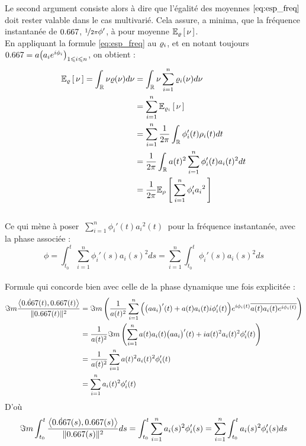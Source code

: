 Le second argument consiste alors à dire que l'égalité des moyennes $\eqref{eq:esp_freq}$ doit rester valable dans le cas multivarié. Cela assure, a minima, que la fréquence instantanée de $\x$, $\nicefrac{1}{2\pi}\phi'$, à pour moyenne $\esp[\densis]{\nu}$.
\\

En appliquant la formule \eqref{eq:esp_freq} au $\densis_i$, et en notant toujours $\x = a\big(a_ie^{i\phi_i}\big)_{1\leq i\leq n}$, on obtient :
\begin{align*}
	\esp[\densis]{\nu} = \int_\R \nu\densis(\nu)d\nu &= \int_\R \nu\sum_{i=1}^n \densis_i(\nu) d\nu \\
	&= \sum_{i=1}^n\esp[\densis_i]{\nu} \\
	&= \sum_{i=1}^n\frac{1}{2\pi}\int_\R \phi_i'(t)\densit_i(t)dt \\
	&= \frac{1}{2\pi}\int_\R a(t)^2\sum_{i=1}^n\phi_i'(t)a_i(t)^2 dt 
	\\ &= \frac{1}{2\pi} \esp[\densit]{\sum_{i=1}^n \phi_i'{a_i}^2}
\end{align*}
\\
Ce qui mène à poser $\displaystyle \ \sum_{i=1}^n \phi_i'(t){a_i}^2(t)\ $ pour la fréquence instantanée, avec la phase associée :
\begin{equation}\label{eq:phas_inst_v2}
	\phi = \int_{t_0}^t \sum_{i=1}^n \phi_i'(s){a_i}(s)^2ds 
	= \sum_{i=1}^n \int_{t_0}^t \phi_i'(s){a_i}(s)^2ds 
\end{equation}
\\

Formule qui concorde bien avec celle de la phase dynamique une fois explicitée :
\begin{align*}
	\Im m\frac{\big\langle \dot{\x}(t) , \x(t) \big\rangle}{\|\x(t)\|^2} &= \Im m\left( \frac{1}{a(t)^2} \sum_{i=1}^n \Big( \big(aa_i\big)'(t) +a(t)a_i(t)i\phi_i'(t)\Big)e^{i\phi_i(t)}\congu{a(t)a_i(t)e^{i\phi_i(t)}} \right) \\
	&=\frac{1}{a(t)^2}  \Im m\left( \sum_{i=1}^n a(t)a_i(t)\big(aa_i\big)'(t) +ia(t)^2a_i(t)^2\phi_i'(t) \right) \\
	&= \frac{1}{a(t)^2} \sum_{i=1}^n a(t)^2a_i(t)^2 \phi_i'(t) \\
	&= \sum_{i=1}^n a_i(t)^2 \phi_i'(t)
\end{align*}
D'où
\[\Im m\int_{t_0}^t \frac{\big\langle \dot{\x}(s) , \x(s) \big\rangle}{\|\x(s)\|^2} ds = \int_{t_0}^t \sum_{i=1}^n a_i(s)^2 \phi_i'(s) = \sum_{i=1}^n \int_{t_0}^t a_i(s)^2 \phi_i'(s)ds\]
\skipl




